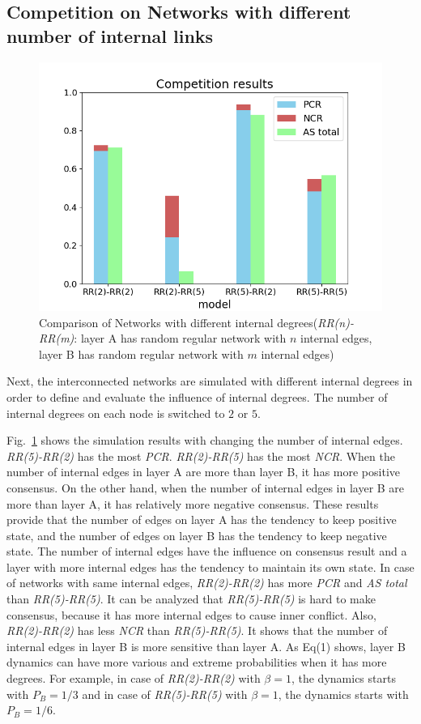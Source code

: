\documentclass[english]{cccconf}
\begin{document}
\subsection{Competition on Networks with different number of internal links}
\begin{figure}[!htb]
	\centering
	\includegraphics[width=\hsize]{FIG5.png}
	\caption{Comparison of Networks with different internal degrees(\textit{RR(n)-RR(m)}: layer A has random regular network with $n$ internal edges, layer B has random regular network with $m$ internal edges)}
	\label{Fig5}
\end{figure}
Next, the interconnected networks are simulated with different internal degrees in order to define and evaluate the influence of internal degrees. The number of internal degrees on each node is switched to $2$ or $5$.

Fig.~\ref{Fig5} shows the simulation results with changing the number of internal edges. \textit{RR(5)-RR(2)} has the most \textit{PCR}. \textit{RR(2)-RR(5)} has the most \textit{NCR}. When the number of internal edges in layer A are more than layer B, it has more positive consensus. On the other hand, when the number of internal edges in layer B are more than layer A, it has relatively more negative consensus. These results provide that the number of edges on layer A has the tendency to keep positive state, and the number of edges on layer B has the tendency to keep negative state. The number of internal edges have the influence on consensus result and a layer with more internal edges has the tendency to maintain its own state. In case of networks with same internal edges, \textit{RR(2)-RR(2)} has more \textit{PCR} and \textit{AS total} than \textit{RR(5)-RR(5)}. It can be analyzed that \textit{RR(5)-RR(5)} is hard to make consensus, because it has more internal edges to cause inner conflict. Also, \textit{RR(2)-RR(2)} has less \textit{NCR} than \textit{RR(5)-RR(5)}. It shows that the number of internal edges in layer B is more sensitive than layer A. As Eq(1) shows, layer B dynamics can have more various and extreme probabilities when it has more degrees. For example, in case of \textit{RR(2)-RR(2)} with $\beta = 1$, the dynamics starts with $P_B=1/3$ and in case of \textit{RR(5)-RR(5)} with $\beta = 1$, the dynamics starts with $P_B=1/6$.    
\end{document}
